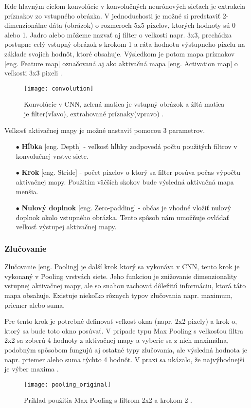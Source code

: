 Kde hlavným cieľom konvolúcie v konvolučných neurónových sieťach je extrakcia príznakov zo vstupného obrázka.
V jednoduchosti je možné si predstaviť 2-dimenzionálne dáta (obrázok) o rozmeroch 5x5 pixelov, ktorých hodnoty sú 0 alebo 1.
Jadro alebo môžeme nazvať aj filter o veľkosti napr. 3x3, prechádza postupne celý vstupný obrázok s krokom 1 a ráta hodnotu výstupneho pixelu na základe svojich hodnôt, ktoré obsahuje.
Výsledkom je potom mapa príznakov [eng. Feature map] označovaná aj ako aktivačná mapa [eng. Activation map] o veľkosti 3x3 pixeli \cite{odkaz:CNNArticle}.
\begin{figure}[H]
    \centering
    \texttt{[image: convolution]}
    \caption{Konvolúcie v CNN, zelená matica je vstupný obrázok a žltá matica je filter(vľavo), extrahované príznaky(vpravo) \cite{odkaz:CNNArticle}.}
    \label{pic:Convolution}
\end{figure}

Veľkosť aktivačnej mapy je možné nastaviť pomocou 3 parametrov.
\begin{enumerate}
    \item[$\bullet$] \textbf{Hĺbka} [eng. Depth] - veľkosť hĺbky zodpovedá počtu použitých filtrov v konvolučnej vrstve siete.
    \item[$\bullet$] \textbf{Krok} [eng. Stride] - počet pixelov o ktorý sa filter posúva počas výpočtu aktivačnej mapy.
    Použitím väčších skokov bude výsledná aktivačná mapa menšia.
    \item[$\bullet$] \textbf{Nulový doplnok} [eng. Zero-padding] - občas je vhodné vložiť nulový doplnok okolo vstupného obrázka.
    Tento spôsob nám umožňuje ovládať veľkosť výstupej aktivačnej mapy.
\end{enumerate}


\subsubsection{Zlučovanie}
Zlučovanie [eng. Pooling] je další krok ktorý sa vykonáva v CNN, tento krok je vykonaný v Pooling vrstvách siete.
Jeho funkciou je znižovanie dimenzionality vstupnej aktivačnej mapy, ale so snahou zachovať dôležitú informáciu, ktorá táto mapa obsahuje.
Existuje niekoľko rôznych typov zlučovania napr. maximum, priemer alebo suma.

Pre tento krok je potrebné definovať veľkost okna (napr. 2x2 pixely) a krok o, ktorý sa bude toto okno posúvať.
V prípade typu Max Pooling s veľkosťou filtra 2x2 sa zoberú 4 hodnoty z aktivačnej mapy a vyberie sa z nich maximálna, podobným spôsobom
    fungujú aj ostatné typy zlučovania, ale výsledná hodnota je napr. priemer alebo suma týchto 4 hodnôt.
V praxi sa ukázalo, že najvýhodnejší je výber maxima \cite{odkaz:CNNArticle}.
\begin{figure}[H]
    \centering
    \texttt{[image: pooling\_original]}
    \caption{Príklad použitia Max Pooling s filtrom 2x2 a krokom 2 \cite{odkaz:CNNArticle}.}
    \label{pic:Convolution}
\end{figure}



